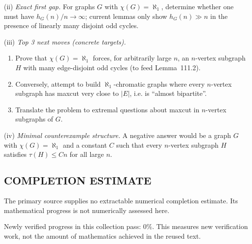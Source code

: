 (ii) \emph{Exact first gap.}
For graphs $G$ with $\chi(G)=\aleph_1$, determine whether one must have $h_G(n)/n\to\infty$; current lemmas only show $h_G(n)\gg n$ in the presence of linearly many disjoint odd cycles.

(iii) \emph{Top 3 next moves (concrete targets).}
\begin{enumerate}
\item Prove that $\chi(G)=\aleph_1$ forces, for arbitrarily large $n$, an $n$-vertex subgraph $H$ with many edge-disjoint odd cycles (to feed Lemma~111.2).
\item Conversely, attempt to build $\aleph_1$-chromatic graphs where every $n$-vertex subgraph has maxcut very close to $|E|$, i.e. is ``almost bipartite''.
\item Translate the problem to extremal questions about maxcut in $n$-vertex subgraphs of $G$.
\end{enumerate}

(iv) \emph{Minimal counterexample structure.}
A negative answer would be a graph $G$ with $\chi(G)=\aleph_1$ and a constant $C$ such that every $n$-vertex subgraph $H$ satisfies $\tau(H)\le Cn$ for all large $n$.




\subsection*{COMPLETION ESTIMATE}
The primary source supplies no extractable numerical completion estimate. Its mathematical progress is not numerically assessed here.

Newly verified progress in this collection pass: $0\%$. This measures new verification work, not the amount of mathematics achieved in the reused text.
